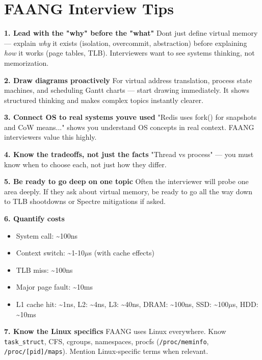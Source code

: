 \documentclass[11pt]{article}
\providecommand{\tightlist}{\setlength{\itemsep}{1pt}\setlength{\parskip}{0pt}}
\begin{document}
\section{FAANG Interview Tips}\label{faang-interview-tips}

\textbf{1. Lead with the "why" before the "what"}
Don\textquotesingle t just define virtual memory --- explain \emph{why} it exists (isolation, overcommit, abstraction) before explaining \emph{how} it works (page tables, TLB). Interviewers want to see systems thinking, not memorization.

\textbf{2. Draw diagrams proactively}
For virtual address translation, process state machines, and scheduling Gantt charts --- start drawing immediately. It shows structured thinking and makes complex topics instantly clearer.

\textbf{3. Connect OS to real systems you\textquotesingle ve used}
"Redis uses fork() for snapshots and CoW means..." shows you understand OS concepts in real context. FAANG interviewers value this highly.

\textbf{4. Know the tradeoffs, not just the facts}
"Thread vs process" --- you must know when to choose each, not just how they differ.

\textbf{5. Be ready to go deep on one topic}
Often the interviewer will probe one area deeply. If they ask about virtual memory, be ready to go all the way down to TLB shootdowns or Spectre mitigations if asked.

\textbf{6. Quantify costs}

\begin{itemize}
\tightlist
\item
  System call: \textasciitilde100ns
\item
  Context switch: \textasciitilde1-10\(\mu\)s (with cache effects)
\item
  TLB miss: \textasciitilde100ns
\item
  Major page fault: \textasciitilde10ms
\item
  L1 cache hit: \textasciitilde1ns, L2: \textasciitilde4ns, L3: \textasciitilde40ns, DRAM: \textasciitilde100ns, SSD: \textasciitilde100\(\mu\)s, HDD: \textasciitilde10ms
\end{itemize}

\textbf{7. Know the Linux specifics}
FAANG uses Linux everywhere. Know \texttt{task\_struct}, CFS, cgroups, namespaces, procfs (\texttt{/proc/meminfo}, \texttt{/proc/{[}pid{]}/maps}). Mention Linux-specific terms when relevant.
\end{document}
